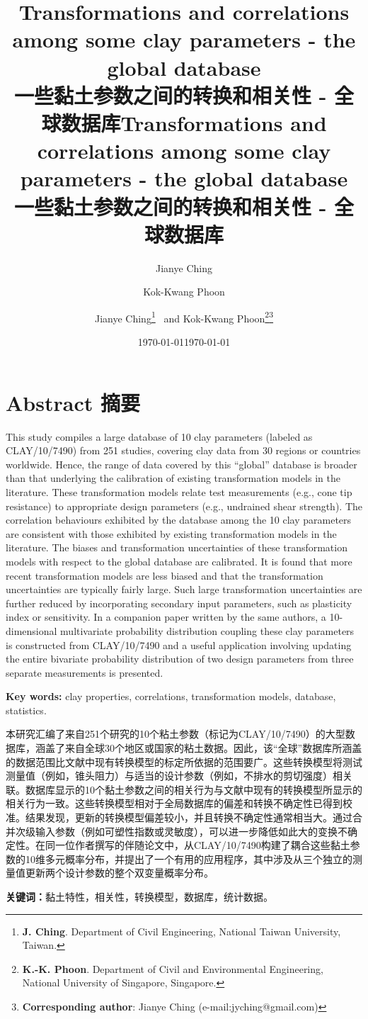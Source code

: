\documentclass{myarticle}
\title{\textbf{Transformations and correlations among some clay parameters - the global database\\一些黏土参数之间的转换和相关性 - 全球数据库}}
\date{\today}
\author{Jianye Ching \and Kok-Kwang Phoon}
\title{\textbf{Transformations and correlations among some clay parameters - the global database\\一些黏土参数之间的转换和相关性 - 全球数据库}}
\date{\today}
\author{Jianye Ching\thanks{
    \textbf{J. Ching}. Department of Civil Engineering, National Taiwan University, Taiwan.
} ~and Kok-Kwang Phoon\thanks{
    \textbf{K.-K. Phoon}. Department of Civil and Environmental Engineering, National University of Singapore, Singapore.
}\thanks{
    \textbf{Corresponding author}: Jianye Ching (e-mail:jyching@gmail.com)
}}
\begin{document}
\maketitle

\section*{Abstract 摘要}

\begin{paracol}{2}
    This study compiles a large database of 10 clay parameters (labeled as CLAY/10/7490) from 251 studies, covering clay data from 30 regions or countries worldwide. Hence, the range of data covered by this “global” database is broader than that underlying the calibration of existing transformation models in the literature. These transformation models relate test measurements (e.g., cone tip resistance) to appropriate design parameters (e.g., undrained shear strength). The correlation behaviours exhibited by the database among the 10 clay parameters are consistent with those exhibited by existing transformation models in the literature. The biases and transformation uncertainties of these transformation models with respect to the global database are calibrated. It is found that more recent transformation models are less biased and that the transformation uncertainties are typically fairly large. Such large transformation uncertainties are further reduced by incorporating secondary input parameters, such as plasticity index or sensitivity. In a companion paper written by the same authors, a 10-dimensional multivariate probability distribution coupling these clay parameters is constructed from CLAY/10/7490 and a useful application involving updating the entire bivariate probability distribution of two design parameters from three separate measurements is presented.

    \textbf{Key words: }clay properties, correlations, transformation models, database, statistics.

    \switchcolumn
    本研究汇编了来自251个研究的10个粘土参数（标记为CLAY/10/7490）的大型数据库，涵盖了来自全球30个地区或国家的粘土数据。因此，该“全球”数据库所涵盖的数据范围比文献中现有转换模型的标定所依据的范围要广。这些转换模型将测试测量值（例如，锥头阻力）与适当的设计参数（例如，不排水的剪切强度）相关联。数据库显示的10个黏土参数之间的相关行为与文献中现有的转换模型所显示的相关行为一致。这些转换模型相对于全局数据库的偏差和转换不确定性已得到校准。结果发现，更新的转换模型偏差较小，并且转换不确定性通常相当大。通过合并次级输入参数（例如可塑性指数或灵敏度），可以进一步降低如此大的变换不确定性。在同一位作者撰写的伴随论文中，从CLAY/10/7490构建了耦合这些黏土参数的10维多元概率分布，并提出了一个有用的应用程序，其中涉及从三个独立的测量值更新两个设计参数的整个双变量概率分布。

    \textbf{关键词：}黏土特性，相关性，转换模型，数据库，统计数据。
\end{paracol}
\end{document}
